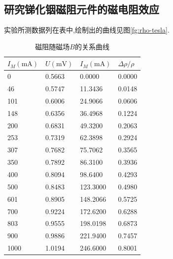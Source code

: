 \documentclass[UTF8,a4paper]{article}%
\begin{document}
\subsection{研究锑化铟磁阻元件的磁电阻效应}
实验所测数据列在表中,绘制出的曲线见图\ref{fg:rho-tesla}.
\begin{table}[H]
    \centering
    \caption{磁阻随磁场$B$的关系曲线}
    \begin{tabular}{l|l|l|l}
        \hline
        $I_M(\unit{\mA})$ & $U(\unit{\mV})$ & $I_M(\unit{\mA})$ & $\Delta\rho/\rho$ \\ \hline
        0                 & 0.5663          & 0.0000            & 0.0000            \\
        46                & 0.5747          & 11.3436           & 0.0148            \\
        101               & 0.6006          & 24.9066           & 0.0606            \\
        148               & 0.6356          & 36.4968           & 0.1224            \\
        200               & 0.6831          & 49.3200           & 0.2063            \\
        253               & 0.7319          & 62.3898           & 0.2924            \\
        307               & 0.7682          & 75.7062           & 0.3565            \\
        350               & 0.7892          & 86.3100           & 0.3936            \\
        400               & 0.8094          & 98.6400           & 0.4293            \\
        500               & 0.8483          & 123.3000          & 0.4980            \\
        601               & 0.8905          & 148.2066          & 0.5725            \\
        700               & 0.9224          & 172.6200          & 0.6288            \\
        803               & 0.9555          & 198.0198          & 0.6873            \\
        900               & 0.9886          & 221.9400          & 0.7457            \\
        1000              & 1.0194          & 246.6000          & 0.8001            \\ \hline
    \end{tabular}
\end{table}
\end{document}
